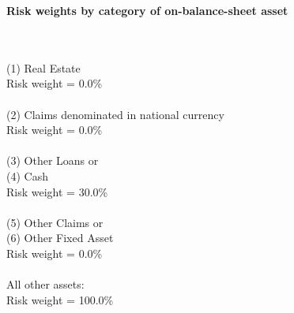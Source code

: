\documentclass{article}
\begin{document}
\setlength{\parindent}{0em}
\begin{center}{\bf Risk weights by category of on-balance-sheet asset}\end{center}
~\\
~\\

(1) Real Estate\\
Risk weight = 0.0\%\\

~\\
(2) Claims denominated in national currency \\
Risk weight = 0.0\%\\

~\\
(3) Other Loans or \\
(4) Cash \\
Risk weight = 30.0\%\\

~\\
(5) Other Claims or \\
(6) Other Fixed Asset\\
Risk weight = 0.0\%\\

~\\
All other assets:\\
Risk weight = 100.0\%\\

~\\
\end{document}
